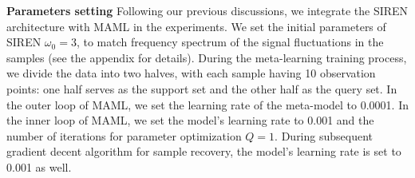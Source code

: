 \documentclass{article}
\begin{document}
\textbf{Parameters setting} 
Following our previous discussions, we integrate the SIREN architecture with MAML in the experiments. 
We set the initial parameters of SIREN $\omega_0=3$, to match frequency spectrum of the signal fluctuations in the samples (see the appendix for details).
During the meta-learning training process, we divide the data into two halves, with each sample having 10 observation points: one half serves as the support set and the other half as the query set.
In the outer loop of MAML, we set the learning rate of the meta-model to 0.0001. 
In the inner loop of MAML, we set the model's learning rate to 0.001 and the number of iterations for parameter optimization $Q=1$.
During subsequent gradient decent algorithm for sample recovery, the model's learning rate is set to 0.001 as well.

\end{document}
